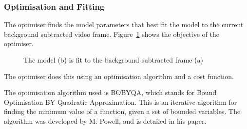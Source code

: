 \subsubsection{Optimisation and Fitting}

The optimiser finds the model parameters that best fit the model to the current background subtracted video frame. Figure~\ref{fig:modelfit} shows the objective of the optimiser.

\begin{figure}[H]
    \centering
\caption{The model (b) is fit to the background subtracted frame (a)}
\label{fig:modelfit}
\end{figure}

The optimiser does this using an optimisation algorithm and a cost function.

The optimisation algorithm used is BOBYQA, which stands for Bound Optimisation BY Quadratic Approximation. This is an iterative algorithm for finding the minimum value of a function, given a set of bounded variables. The algorithm was developed by M. Powell, and is detailed in his paper\cite{bobyqa}.

